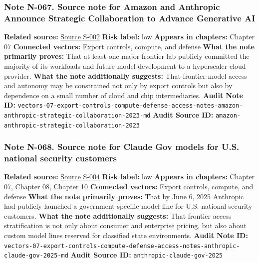 \documentclass[
  american,
  11pt,
  letterpaper,
]{article}
\begin{document}
\subsubsection{Note N-067. Source note for Amazon and Anthropic Announce
Strategic Collaboration to Advance Generative
AI}\label{note-n-067-vectors-07-export-controls-compute-defense-access-notes-amazon-anthropic-strategic-collaboration-2023-md}

\textbf{Related source:}
\hyperref[source-s-002-amazon-and-anthropic-announce-strategic-collaboration-to-advance-generative-ai]{Source
S-002} \textbf{Risk label:} low \textbf{Appears in chapters:} Chapter 07
\textbf{Connected vectors:} Export controls, compute, and defense
\textbf{What the note primarily proves:} That at least one major
frontier lab publicly committed the majority of its workloads and future
model development to a hyperscaler cloud provider. \textbf{What the note
additionally suggests:} That frontier-model access and autonomy may be
constrained not only by export controls but also by dependence on a
small number of cloud and chip intermediaries. \textbf{Audit Note ID:}
\texttt{vectors-07-export-controls-compute-defense-access-notes-amazon-anthropic-strategic-collaboration-2023-md}
\textbf{Audit Source ID:}
\texttt{amazon-anthropic-strategic-collaboration-2023}

\subsubsection{Note N-068. Source note for Claude Gov models for U.S.
national security
customers}\label{note-n-068-vectors-07-export-controls-compute-defense-access-notes-anthropic-claude-gov-2025-md}

\textbf{Related source:}
\hyperref[source-s-004-claude-gov-models-for-u-s-national-security-customers]{Source
S-004} \textbf{Risk label:} low \textbf{Appears in chapters:} Chapter
07, Chapter 08, Chapter 10 \textbf{Connected vectors:} Export controls,
compute, and defense \textbf{What the note primarily proves:} That by
June 6, 2025 Anthropic had publicly launched a government-specific model
line for U.S. national security customers. \textbf{What the note
additionally suggests:} That frontier access stratification is not only
about consumer and enterprise pricing, but also about custom model lines
reserved for classified state environments. \textbf{Audit Note ID:}
\texttt{vectors-07-export-controls-compute-defense-access-notes-anthropic-claude-gov-2025-md}
\textbf{Audit Source ID:} \texttt{anthropic-claude-gov-2025}
\end{document}
